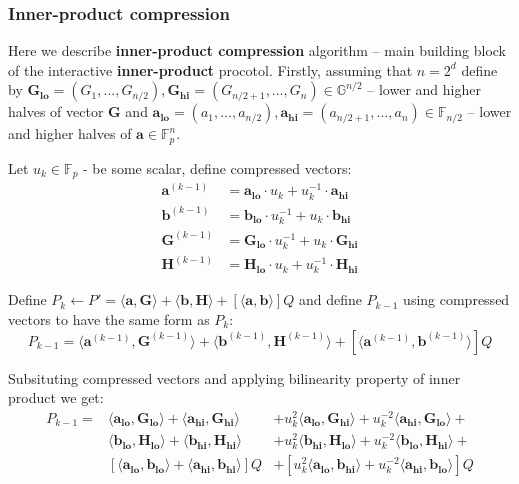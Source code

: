 \documentclass[../lecture-notes-148x210.tex]{subfiles}
\begin{document}
\subsubsection{Inner-product compression}

Here we describe \textbf{inner-product compression} algorithm -- main building block of the interactive \textbf{inner-product} procotol.
Firstly, assuming that $n = 2^d$ define by $\mathbf{G_{lo}} = (G_1, \dots, G_{n/2}), \mathbf{G_{hi}} = (G_{n/2+1},\dots, G_n) \in \mathbb{G}^{n/2}$ -- lower and higher halves of vector $\mathbf{G}$ and $\mathbf{a_{lo}} = (a_1, \dots, a_{n/2}), \mathbf{a_{hi}} = (a_{n/2+1},\dots,a_n) \in \mathbb{F}_{n/2}$ -- lower and higher halves of $\mathbf{a} \in \mathbb{F}_p^{n}$.

Let $u_k \in \mathbb{F}_p$ - be some scalar, define compressed vectors:
\begin{align}
    \mathbf{a}^{(k-1)} &= \mathbf{a_{lo}} \cdot u_k + u_k^{-1} \cdot \mathbf{a_{hi}} \\
    \mathbf{b}^{(k-1)} &= \mathbf{b_{lo}} \cdot u_k^{-1} + u_k \cdot \mathbf{b_{hi}} \\
    \mathbf{G}^{(k-1)} &= \mathbf{G_{lo}} \cdot u_k^{-1} + u_k \cdot \mathbf{G_{hi}} \\
    \mathbf{H}^{(k-1)} &= \mathbf{H_{lo}} \cdot u_k + u_k^{-1} \cdot \mathbf{H_{hi}}
\end{align}

Define $P_k \gets P' =  \langle \mathbf{a,G} \rangle + \langle \mathbf{b,H} \rangle + [\langle \mathbf{a,b} \rangle]Q$ and define $P_{k-1}$ using compressed vectors to have the same form as $P_k$:
$$P_{k-1} = \langle \mathbf{a}^{(k-1)}, \mathbf{G}^{(k-1)} \rangle + \langle \mathbf{b}^{(k-1)}, \mathbf{H}^{(k-1)} \rangle + [\langle \mathbf{a}^{(k-1)}, \mathbf{b}^{(k-1)} \rangle]Q $$

Subsituting compressed vectors and applying bilinearity property of inner product we get:
\begin{align}
    P_{k-1} = & \langle \mathbf{a_{lo}}, \mathbf{G_{lo}}\rangle + \langle \mathbf{a_{hi}}, \mathbf{G_{hi}}\rangle &+ u_k^2\langle \mathbf{a_{lo}}, \mathbf{G_{hi}}\rangle + u_k^{-2}\langle \mathbf{a_{hi}}, \mathbf{G_{lo}}\rangle + \\
    & \langle \mathbf{b_{lo}}, \mathbf{H_{lo}}\rangle + \langle \mathbf{b_{hi}}, \mathbf{H_{hi}}\rangle &+ u_k^2\langle \mathbf{b_{hi}}, \mathbf{H_{lo}}\rangle + u_k^{-2}\langle \mathbf{b_{lo}}, \mathbf{H_{hi}}\rangle + \\
    & [\langle \mathbf{a_{lo}}, \mathbf{b_{lo}}\rangle + \langle \mathbf{a_{hi}}, \mathbf{b_{hi}}\rangle]Q &+ [u_k^2\langle \mathbf{a_{lo}}, \mathbf{b_{hi}}\rangle + u_k^{-2}\langle \mathbf{a_{hi}}, \mathbf{b_{lo}}\rangle]Q
\end{align}
\end{document}
